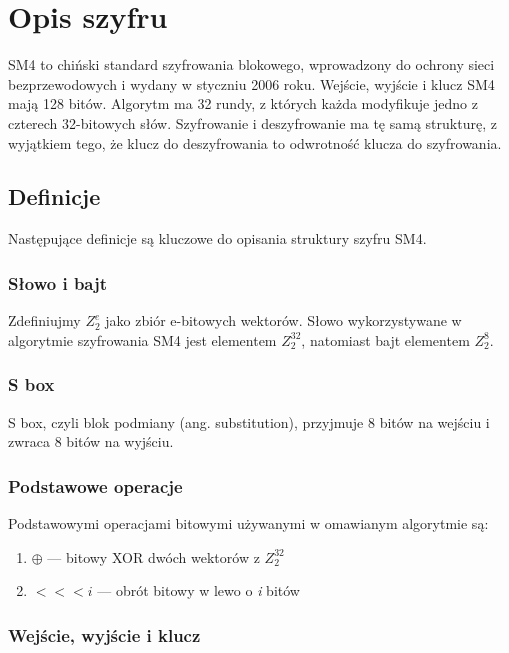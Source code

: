 \section{Opis szyfru\cite{4}}

SM4 to chiński standard szyfrowania blokowego, wprowadzony do ochrony sieci bezprzewodowych i wydany w styczniu 2006 roku. Wejście, wyjście i klucz SM4 mają 128 bitów.
Algorytm ma 32 rundy, z których każda modyfikuje jedno z czterech 32-bitowych słów. Szyfrowanie i
deszyfrowanie ma tę samą strukturę, z wyjątkiem tego, że klucz do deszyfrowania to
odwrotność klucza do szyfrowania.

\subsection{Definicje}

Następujące definicje są kluczowe do opisania struktury szyfru SM4.

\subsubsection{Słowo i bajt}

Zdefiniujmy $Z^{e}_{2}$ jako zbiór e-bitowych wektorów. Słowo wykorzystywane w algorytmie szyfrowania SM4 jest elementem $Z^{32}_{2}$, natomiast bajt elementem $Z^{8}_{2}$.

\subsubsection{S box}

S box, czyli blok podmiany (ang. substitution), przyjmuje 8 bitów na wejściu i zwraca 8 bitów na wyjściu. 

\subsubsection{Podstawowe operacje}

Podstawowymi operacjami bitowymi używanymi w omawianym algorytmie są:
\begin{enumerate}
    \item $\oplus$ --- bitowy XOR dwóch wektorów z $Z^{32}_{2}$
    \item $<<< \textit{i}$ --- obrót bitowy w lewo o \textit{i} bitów
\end{enumerate}

\subsubsection{Wejście, wyjście i klucz}

